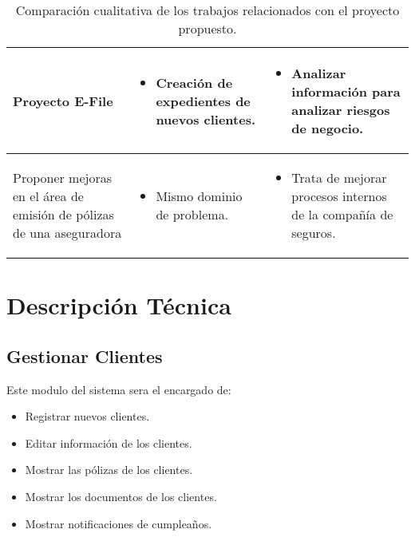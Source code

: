 \begin{table}[ht!]
\begin{tabular}{p{} p{} p{}}
\midrule
Proyecto E-File &
\begin{itemize}[leftmargin=*]
	\item Creación de expedientes de nuevos clientes.
\end{itemize} &
\begin{itemize}[leftmargin=*]
	\item Analizar información para analizar riesgos de negocio.
\end{itemize} \\


\midrule
Proponer mejoras en el área de emisión de pólizas de una aseguradora &
\begin{itemize}[leftmargin=*]
	\item Mismo dominio de problema.  
\end{itemize} &
\begin{itemize}[leftmargin=*]
	\item Trata de mejorar procesos internos de la compañía de seguros.
\end{itemize} \\


    \bottomrule
  \end{tabular}
  \caption{Comparación cualitativa de los trabajos relacionados con el proyecto propuesto.}
  \label{table:related}
\end{table}

\section{Descripción Técnica}

\subsection*{Gestionar Clientes}

Este modulo del sistema sera el encargado de:
\begin{itemize}
	\item Registrar nuevos clientes.
	\item Editar información de los clientes.
	\item Mostrar las pólizas de los clientes.
	\item Mostrar los documentos de los clientes.
	\item Mostrar notificaciones de cumpleaños.
\end{itemize}

